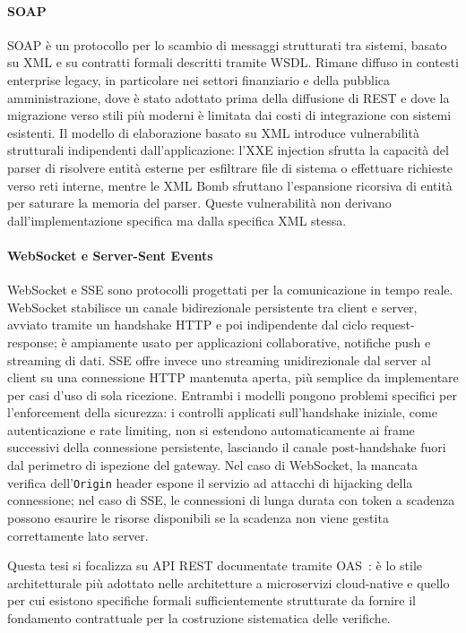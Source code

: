\paragraph{SOAP}
\gls{SOAP} è un protocollo per lo scambio di messaggi strutturati tra sistemi, basato su \gls{XML} e su contratti formali descritti tramite \gls{WSDL}. Rimane diffuso in contesti enterprise legacy, in particolare nei settori finanziario e della pubblica amministrazione, dove è stato adottato prima della diffusione di REST e dove la migrazione verso stili più moderni è limitata dai costi di integrazione con sistemi esistenti. Il modello di elaborazione basato su \gls{XML} introduce vulnerabilità strutturali indipendenti dall'applicazione: l'\gls{XXE} injection sfrutta la capacità del parser di risolvere entità esterne per esfiltrare file di sistema o effettuare richieste verso reti interne, mentre le XML Bomb sfruttano l'espansione ricorsiva di entità per saturare la memoria del parser. Queste vulnerabilità non derivano dall'implementazione specifica ma dalla specifica \gls{XML} stessa.

\paragraph{WebSocket e Server-Sent Events}
WebSocket e \gls{SSE} sono protocolli progettati per la comunicazione in tempo reale. WebSocket stabilisce un canale bidirezionale persistente tra client e server, avviato tramite un handshake \gls{HTTP} e poi indipendente dal ciclo request-response; è ampiamente usato per applicazioni collaborative, notifiche push e streaming di dati. \gls{SSE} offre invece uno streaming unidirezionale dal server al client su una connessione \gls{HTTP} mantenuta aperta, più semplice da implementare per casi d'uso di sola ricezione. Entrambi i modelli pongono problemi specifici per l'enforcement della sicurezza: i controlli applicati sull'handshake iniziale, come autenticazione e rate limiting, non si estendono automaticamente ai frame successivi della connessione persistente, lasciando il canale post-handshake fuori dal perimetro di ispezione del gateway. Nel caso di WebSocket, la mancata verifica dell'\texttt{Origin} header espone il servizio ad attacchi di hijacking della connessione; nel caso di \gls{SSE}, le connessioni di lunga durata con token a scadenza possono esaurire le risorse disponibili se la scadenza non viene gestita correttamente lato server.

Questa tesi si focalizza su \gls{API} \gls{REST} documentate tramite \gls{OAS}~\cite{OpenAPISpecificationV320}: è lo stile architetturale più adottato nelle architetture a microservizi cloud-native e quello per cui esistono specifiche formali sufficientemente strutturate da fornire il fondamento contrattuale per la costruzione sistematica delle verifiche.


